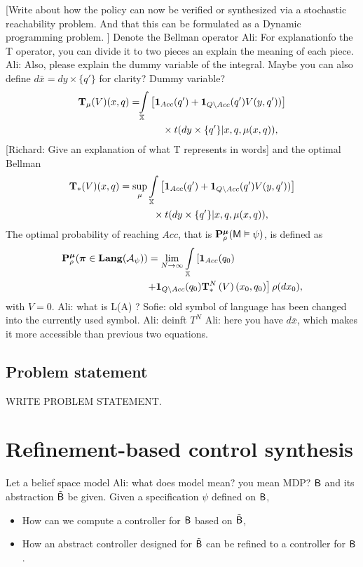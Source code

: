 \documentclass{ifacconf}
\newcommand{\red}[1]{{\color{red} #1}}
\renewcommand{\axx}[1]{{\color{orange} Ali: #1}}
\begin{document}
\red{[Write about how the policy can now be verified or synthesized via a stochastic reachability problem. And that this can be formulated as a Dynamic programming problem.  ]}
Denote the Bellman operator
\axx{For explanationfo the T operator, you can divide it to two pieces an explain the meaning of each piece.}
\axx{Also, please explain the dummy variable of the integral. Maybe you can also define $d\bar{x}=dy\times\{q'\}$ for clarity?}\red{Dummy variable?}
\begin{align}\label{eq:V_recopt_inf}
& \Bel_\pol (V)(x,q) =\!\!\int_{\bar\X}  \left[\mathbf 1_{Acc}(q')+  \mathbf 1_{Q\setminus Acc}( q')V( y, q'))\right]\notag\\&\hspace{3cm}\hfill 
\times \bar{\tr}(d y\times\{q'\}|x,q,\pol(x,q)),
\end{align}
\red{[Richard: Give an explanation of what T represents in words]}
and the optimal Bellman 
\begin{align}\label{eq:V_recopt_inf}
& \Bel_\ast (V)(x,q) =\sup_\pol\int_{\X}\left[\mathbf 1_{Acc}( q')+  \mathbf 1_{Q\setminus Acc}(q')V(y,q'))\right]\notag\\&\hspace{3cm}\hfill\times \bar{\tr}(d y\times\{q'\}|x,q,\pol(x,q)),
\end{align}
The optimal probability of reaching $Acc $, that is $\mathbf{P}_\rho^{\boldsymbol{\mu}}(\mathsf{M}\vDash\psi) $, is defined as
\begin{align*}
&\P_\init^\polb
(\word \in\Language(\mathcal A_\psi))= 	\lim_{N\rightarrow \infty}\int_{\bar{\X}}\left[\mathbf 1_{Acc}( q_0)\right.\\ &\hspace{3cm} \left.+ \mathbf 1_{Q\setminus Acc}(q_0) \Bel^N_\ast\left( V\right)(x_0,q_0)\right] {\init} (d \bar x_0),
\end{align*}
with $V=0$.
\axx{what is L(A) ? }\red{Sofie: old symbol of language has been changed into the currently used symbol.}
\axx{deinft $T^N$}
\axx{here you have $d\bar{x}$, which makes it more accessible than previous two equations.}

\subsection{Problem statement}
\red{WRITE PROBLEM STATEMENT.}
\section{Refinement-based control synthesis} \label{sec:refinement}
 Let a belief space model \axx{what does model mean? you mean MDP?} $\mathsf{B}$ and its abstraction $\tilde {\mathsf{B}}$ be given.  Given a specification $\psi$ defined on $\mathsf{B}$,  \begin{itemize}
	\item How can we compute a controller for $\mathsf{B}$ based on $\tilde {\mathsf{B}}$,
	\item How an abstract controller designed for $\tilde{\mathsf{B}}$ can be refined to a controller for $\mathsf{B}$.
\end{itemize}
\end{document}
